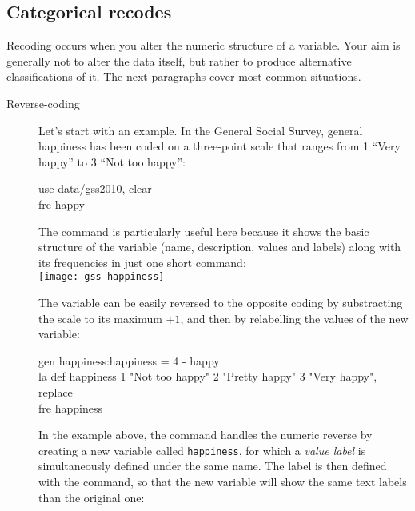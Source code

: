 
%
%
%
\subsection{Categorical recodes}
\label{sec:categorical-recodes}

Recoding occurs when you alter the numeric structure of a variable. Your aim is generally not to alter the data itself, but rather to produce alternative classifications of it. The next paragraphs cover most common situations.

\begin{description}

	\item[Reverse-coding]%
	Let's start with an example. In the General Social Survey, general happiness has been coded on a three-point scale that ranges from 1 ``Very happy'' to 3 ``Not too happy'': 

\begin{docspec}
	use data/gss2010, clear\\
	fre happy\\
\end{docspec}

The  command is particularly useful here because it shows the basic structure of the variable (name, description, values and labels) along with its frequencies in just one short command:\\[1em]

	\texttt{[image: gss-happiness]}

The variable can be easily reversed to the opposite coding by substracting the scale to its maximum $+ 1$, and then by relabelling the values of the new variable:

\begin{fullwidth}
	\begin{docspec}
		gen happiness:happiness = 4 - happy\\
		la def happiness 1 "Not too happy" 2 "Pretty happy" 3 "Very happy", replace\\
		fre happiness
	\end{docspec}
\end{fullwidth}

In the example above, the  command handles the numeric reverse by creating a new variable called \texttt{happiness}, for which a \emph{value label} is simultaneously defined under the same name. The label is then defined with the  command, so that the new variable will show the same text labels than the original one:\\[1em]


\end{description}
